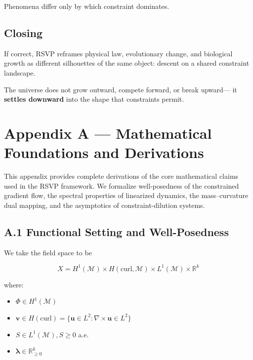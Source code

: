 \documentclass[11pt,a4paper]{article}
\begin{document}
Phenomena differ only by which constraint dominates.

\subsection{Closing}

If correct, RSVP reframes physical law, evolutionary change, and biological growth as different silhouettes of the same object: descent on a shared constraint landscape.

The universe does not grow outward, compete forward, or break upward—  
it \textbf{settles downward} into the shape that constraints permit.

\clearpage
\appendix
\section{Appendix A — Mathematical Foundations and Derivations}

This appendix provides complete derivations of the core mathematical claims used in the RSVP framework. We formalize well-posedness of the constrained gradient flow, the spectral properties of linearized dynamics, the mass–curvature dual mapping, and the asymptotics of constraint-dilution systems.

\subsection{A.1 Functional Setting and Well-Posedness}

We take the field space to be

\[
X = H^1(\mathcal{M}) \times H(\mathrm{curl}, \mathcal{M}) \times L^1(\mathcal{M}) \times \mathbb{R}^k
\]

where:

\begin{itemize}
    \item \( \Phi \in H^1(\mathcal{M}) \)
    \item \( \mathbf{v} \in H(\mathrm{curl}) = \{\mathbf{u} \in L^2: \nabla \times \mathbf{u} \in L^2\}\)
    \item \( S \in L^1(\mathcal{M}), S \ge 0\) a.e.
    \item \( \boldsymbol{\lambda} \in \mathbb{R}^k_{\ge 0} \)
\end{itemize}
\end{document}
